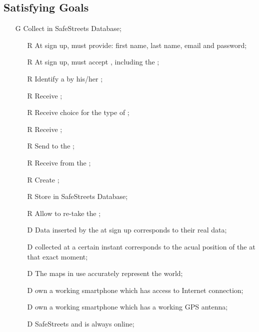 \documentclass[../../../rasd.tex]{subfiles}
\begin{document}
\subsection{Satisfying Goals\label{sect:3.2.6}}
\begin{itemize}
	\item[G\subs{1}]Collect  in SafeStreets Database;
	\begin{itemize}
		\item[R\subs{1}]At sign up,  must provide: first name, last name, email and password;
		\item[R\subs{2}]At sign up,  must accept , including the ;
		\item[R\subs{3}]Identify a  by his/her ;
		\item[R\subs{4}]Receive ;
		\item[R\subs{5}]Receive  choice for the type of ;
		\item[R\subs{6}]Receive ;
		\item[R\subs{7}]Send  to the ;
		\item[R\subs{8}]Receive  from the ;
		\item[R\subs{9}]Create ;
		\item[R\subs{10}]Store  in SafeStreets Database;
		\item[R\subs{33}]Allow  to re-take the ;
		\\
		\item[D\subs{1}]Data inserted by the  at sign up corresponds to their real data;
		\item[D\subs{2}] collected at a certain instant corresponds to the acual position of the  at that exact moment;
		\item[D\subs{3}]The maps in use accurately represent the world;
		\item[D\subs{4}] own a working smartphone which has access to Internet connection;
		\item[D\subs{5}] own a working smartphone which has a working GPS antenna;
		\item[D\subs{6}]SafeStreets and  is always online;
	\end{itemize}


\end{itemize}
\end{document}

